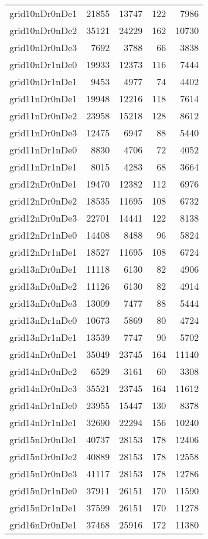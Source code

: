 \begin{longtable}{lrrrr}
grid10nDr0nDe1 & 21855 & 13747 & 122 & 7986 \\
grid10nDr0nDe2 & 35121 & 24229 & 162 & 10730 \\
grid10nDr0nDe3 & 7692 & 3788 & 66 & 3838 \\
grid10nDr1nDe0 & 19933 & 12373 & 116 & 7444 \\
grid10nDr1nDe1 & 9453 & 4977 & 74 & 4402 \\
grid11nDr0nDe1 & 19948 & 12216 & 118 & 7614 \\
grid11nDr0nDe2 & 23958 & 15218 & 128 & 8612 \\
grid11nDr0nDe3 & 12475 & 6947 & 88 & 5440 \\
grid11nDr1nDe0 & 8830 & 4706 & 72 & 4052 \\
grid11nDr1nDe1 & 8015 & 4283 & 68 & 3664 \\
grid12nDr0nDe1 & 19470 & 12382 & 112 & 6976 \\
grid12nDr0nDe2 & 18535 & 11695 & 108 & 6732 \\
grid12nDr0nDe3 & 22701 & 14441 & 122 & 8138 \\
grid12nDr1nDe0 & 14408 & 8488 & 96 & 5824 \\
grid12nDr1nDe1 & 18527 & 11695 & 108 & 6724 \\
grid13nDr0nDe1 & 11118 & 6130 & 82 & 4906 \\
grid13nDr0nDe2 & 11126 & 6130 & 82 & 4914 \\
grid13nDr0nDe3 & 13009 & 7477 & 88 & 5444 \\
grid13nDr1nDe0 & 10673 & 5869 & 80 & 4724 \\
grid13nDr1nDe1 & 13539 & 7747 & 90 & 5702 \\
grid14nDr0nDe1 & 35049 & 23745 & 164 & 11140 \\
grid14nDr0nDe2 & 6529 & 3161 & 60 & 3308 \\
grid14nDr0nDe3 & 35521 & 23745 & 164 & 11612 \\
grid14nDr1nDe0 & 23955 & 15447 & 130 & 8378 \\
grid14nDr1nDe1 & 32690 & 22294 & 156 & 10240 \\
grid15nDr0nDe1 & 40737 & 28153 & 178 & 12406 \\
grid15nDr0nDe2 & 40889 & 28153 & 178 & 12558 \\
grid15nDr0nDe3 & 41117 & 28153 & 178 & 12786 \\
grid15nDr1nDe0 & 37911 & 26151 & 170 & 11590 \\
grid15nDr1nDe1 & 37599 & 26151 & 170 & 11278 \\
grid16nDr0nDe1 & 37468 & 25916 & 172 & 11380 \\

\end{longtable}

